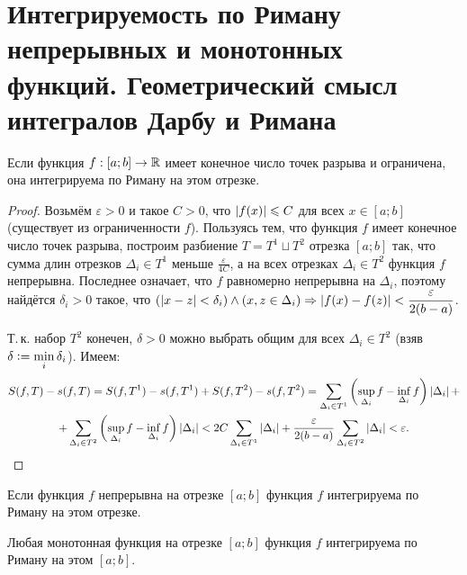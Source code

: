 \section{Интегрируемость по Риману непрерывных и монотонных функций. Геометрический смысл интегралов Дарбу и Римана}

\begin{statement}
    Если функция $f: [a; b] \to \mathbb{R}$ имеет конечное число точек разрыва и ограничена, она интегрируема по Риману на этом отрезке.
\end{statement}

\begin{proof}
    Возьмём $\varepsilon > 0$ и такое $C > 0$, что $\left\lvert f(x)\right\rvert \leqslant C$ для всех $x \in [a; b]$ (существует из ограниченности $f$). Пользуясь тем, что функция $f$ имеет конечное число точек разрыва, построим разбиение $T = T^1 \sqcup T^2$ отрезка $[a; b]$ так, что сумма длин отрезков $\Delta_i \in T^1$ меньше $\frac{\varepsilon}{4C}$, а на всех отрезках $\Delta_i \in T^2$ функция $f$ непрерывна. Последнее означает, что $f$ равномерно непрерывна на $\Delta_i$, поэтому найдётся $\delta_i > 0$ такое, что $\displaystyle\left(\left\lvert x - z\right\rvert < \delta_i\right) \wedge \left(x, z \in \Delta_i\right) \Rightarrow \left\lvert f(x) - f(z)\right\rvert < \frac{\varepsilon}{2(b - a)}$.

    Т.\,к. набор $T^2$ конечен, $\delta > 0$ можно выбрать общим для всех $\Delta_i \in T^2$ (взяв $\delta \vcentcolon = \min\limits_{i}\delta_i$). Имеем:
    \begin{multline*}
        S(f, T) - s(f, T) = S(f, T^1) - s(f, T^1) + S(f, T^2) - s(f, T^2) = \sum_{\Delta_i \in T^1}\left(\sup_{\Delta_i}f - \inf\limits_{\Delta_i}f\right)\left\lvert\Delta_i\right\rvert +\\ + \sum_{\Delta_i \in T^2}\left(\sup_{\Delta_i}f - \inf_{\Delta_i}f\right)\left\lvert\Delta_i\right\rvert < 2C\sum_{\Delta_i \in T^1}\left\lvert\Delta_i\right\rvert + \frac{\varepsilon}{2(b - a)}\sum_{\Delta_i \in T^2}\left\lvert\Delta_i\right\rvert < \varepsilon.
    \end{multline*}
\end{proof}

\begin{corollary}
    Если функция $f$ непрерывна на отрезке $[a; b]$ функция $f$ интегрируема по Риману на этом отрезке.
\end{corollary}

\begin{statement}
    Любая монотонная функция на отрезке $[a; b]$ функция $f$ интегрируема по Риману на этом $[a; b]$.
\end{statement}

